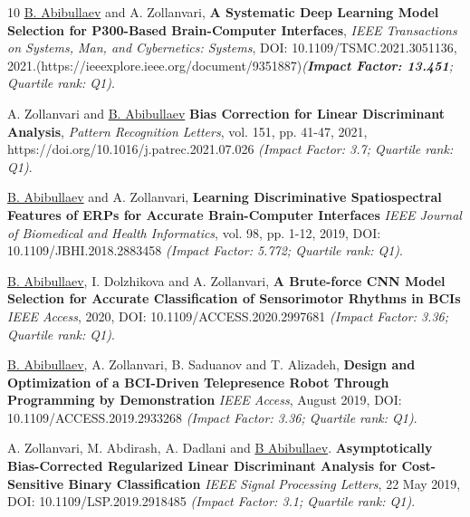 \documentclass[10pt,letterpaper,sans]{moderncv}   %
\begin{document}
\vspace{12pt}
\renewcommand{\refname}{Refereed Journal Publications}  

\label{publication}
\begin{thebibliography}{10}
    \small 
    \underline{B. Abibullaev} and A. Zollanvari,
    \newblock \textbf{A Systematic Deep Learning Model Selection for P300-Based Brain-Computer Interfaces},
    \newblock \textit{IEEE Transactions on Systems, Man, and Cybernetics: Systems}, DOI: 10.1109/TSMC.2021.3051136, 2021.(https://ieeexplore.ieee.org/document/9351887)\textit{(\textbf{Impact Factor: 13.451}; Quartile rank: Q1)}.

    \small 
    A. Zollanvari and \underline{B. Abibullaev}
    \newblock \textbf{Bias Correction for Linear Discriminant Analysis},
    \newblock \textit{Pattern Recognition Letters}, vol. 151, pp. 41-47, 2021, https://doi.org/10.1016/j.patrec.2021.07.026 \textit{(Impact Factor: 3.7; Quartile rank: Q1)}.
 
    \small 
    \underline{B. Abibullaev} and A. Zollanvari,
    \newblock \textbf{Learning Discriminative Spatiospectral Features of ERPs for Accurate Brain-Computer Interfaces}
    \newblock \textit{IEEE Journal of Biomedical and Health Informatics}, vol. 98, pp. 1-12, 2019, DOI: 10.1109/JBHI.2018.2883458 \textit{(Impact Factor: 5.772; Quartile rank: Q1)}.

    \small 
    \underline{B. Abibullaev}, I. Dolzhikova and A. Zollanvari, 
    \newblock \textbf{A Brute-force CNN Model Selection for Accurate Classification of Sensorimotor Rhythms in BCIs} \newblock \textit{IEEE Access}, 2020,  DOI: 10.1109/ACCESS.2020.2997681
    \textit{(Impact Factor: 3.36; Quartile rank: Q1)}.


    \small 
    \underline{B. Abibullaev}, A. Zollanvari, B. Saduanov and T. Alizadeh, 
    \newblock \textbf{Design and Optimization of a BCI-Driven Telepresence Robot Through Programming by Demonstration}
    \newblock \textit{IEEE Access}, August 2019,  DOI: 10.1109/ACCESS.2019.2933268
    \textit{(Impact Factor: 3.36; Quartile rank: Q1)}.

    \small 
    A. Zollanvari,  M. Abdirash, A. Dadlani and \underline{B Abibullaev}.
    \newblock \textbf{Asymptotically Bias-Corrected Regularized Linear Discriminant Analysis for Cost-Sensitive Binary Classification}
    \newblock \textit{IEEE Signal Processing Letters}, 22 May 2019,  DOI: 10.1109/LSP.2019.2918485 \textit{(Impact Factor: 3.1; Quartile rank: Q1)}.
        

\end{thebibliography}
\end{document}

